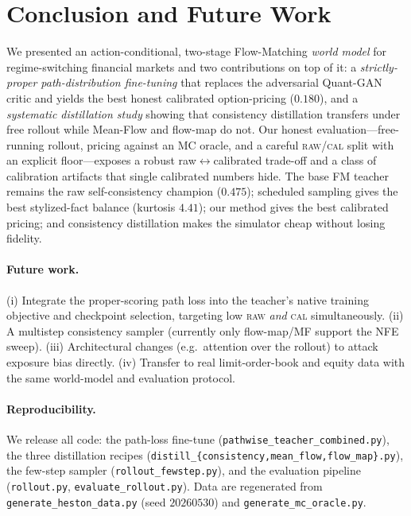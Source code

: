\documentclass[11pt]{article}
\newcommand{\raw}{\textsc{raw}}
\renewcommand{\cal}{\textsc{cal}}
\begin{document}
\section{Conclusion and Future Work}
\label{sec:conclusion}

We presented an action-conditional, two-stage Flow-Matching \emph{world model} for
regime-switching financial markets and two contributions on top of it: a
\emph{strictly-proper path-distribution fine-tuning} that replaces the adversarial
Quant-GAN critic and yields the best honest calibrated option-pricing ($0.180$),
and a \emph{systematic distillation study} showing that consistency distillation
transfers under free rollout while Mean-Flow and flow-map do not. Our honest
evaluation---free-running rollout, pricing against an MC oracle, and a careful
\raw{}/\cal{} split with an explicit floor---exposes a robust
raw$\leftrightarrow$calibrated trade-off and a class of calibration artifacts that
single calibrated numbers hide. The base FM teacher remains the raw
self-consistency champion ($0.475$); scheduled sampling gives the best stylized-fact
balance (kurtosis $4.41$); our method gives the best calibrated pricing; and
consistency distillation makes the simulator cheap without losing fidelity.

\paragraph{Future work.} (i) Integrate the proper-scoring path loss into the
teacher's native training objective and checkpoint selection, targeting low
\raw{} \emph{and} \cal{} simultaneously. (ii) A multistep consistency sampler
(currently only flow-map/MF support the NFE sweep). (iii) Architectural changes
(e.g.\ attention over the rollout) to attack exposure bias directly. (iv) Transfer
to real limit-order-book and equity data with the same world-model and evaluation
protocol.

\paragraph{Reproducibility.} We release all code: the path-loss fine-tune
(\texttt{pathwise\_teacher\_combined.py}), the three distillation recipes
(\texttt{distill\_\{consistency,mean\_flow,flow\_map\}.py}), the few-step sampler
(\texttt{rollout\_fewstep.py}), and the evaluation pipeline
(\texttt{rollout.py}, \texttt{evaluate\_rollout.py}). Data are regenerated from
\texttt{generate\_heston\_data.py} (seed $20260530$) and
\texttt{generate\_mc\_oracle.py}.



\end{document}
